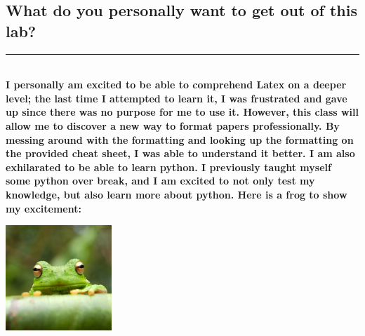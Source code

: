\documentclass[12pt,a4paper]{article}
\newcommand{\HRule}{\rule{\linewidth}{0.5mm}}
\begin{document}
{\large
    \subsection{What do you personally want to get out of this lab?}
}

\HRule \\[10]

    \textbf{I personally am excited to be able to comprehend Latex on a deeper level; the last time I attempted to learn it, I was frustrated and gave up since there was no purpose for me to use it. However, this class will allow me to discover a new way to format papers professionally. By messing around with the formatting and looking up the formatting on the provided cheat sheet, I was able to understand it better. I am also exhilarated to be able to learn python. I previously taught myself some python over break, and I am excited to not only test my knowledge, but also learn more about python. Here is a frog to show my excitement:}



\begin{center}

\includegraphics[width=0.3\textwidth]{frog.jpg}    

\end{center}
\end{document}
